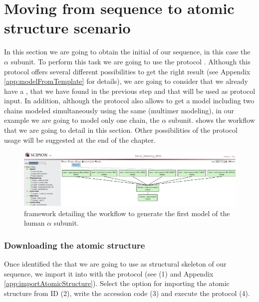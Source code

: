 \section{Moving from sequence to atomic structure scenario}
In this section we are going to obtain the initial  of our  sequence, in this case the  $\alpha$ subunit. To perform this task we are going to use the \scipion protocol . Although this protocol offers several different possibilities to get the right result (see Appendix \ref{app:modelFromTemplate} for details), we are going to consider that we already have a , that we have found in the previous step and that will be used as protocol input. In addition, although the protocol also allows to get a model including two chains modeled simultaneously using the same  (multimer modeling), in our example we are going to model only one chain, the  $\alpha$ subunit.  shows the \scipion workflow that we are going to detail in this section. Other possibilities of the protocol usage will be suggested at the end of the chapter.
\begin{figure}[H]
  \centering 
  \captionsetup{width=.9\linewidth} 
  \includegraphics[width=1\textwidth]{Images/Fig66}
  \caption{\scipion framework detailing the workflow to generate the first model of the human  $\alpha$ subunit.}
  \label{fig:scipion_workflow_from_sequence}
  \end{figure}
\subsubsection*{Downloading the atomic structure}
  
  Once identified the  that we are going to use as structural skeleton of our sequence, we import it into \scipion with the protocol  (see  (1) and Appendix \ref{app:importAtomicStructure}). Select the option for importing the atomic structure from ID (2), write the  accession code (3) and execute the protocol (4). 
  
